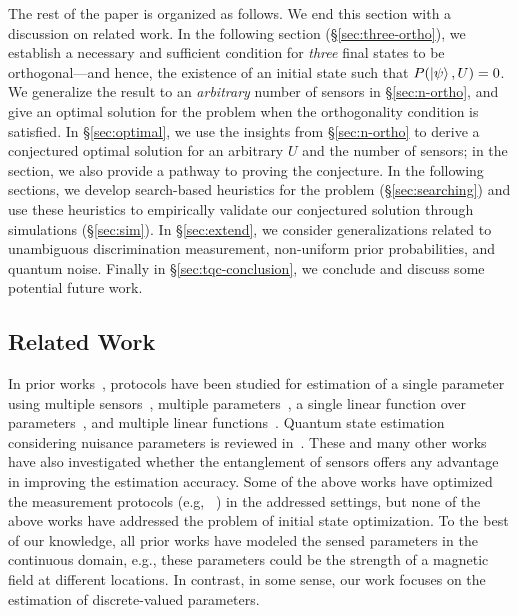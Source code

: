 The rest of the paper is organized as follows. We end this section with a discussion on related work.
In the following section (\S\ref{sec:three-ortho}), 
we establish a necessary and sufficient condition for \emph{three} final states to be orthogonal---and hence, the existence of an initial state such that 
$P(\ket{\psi}, U) = 0$. 
We generalize the result to an \emph{arbitrary} number of sensors in \S\ref{sec:n-ortho},
and give an optimal solution for the \iso problem when the orthogonality condition is satisfied.
In \S\ref{sec:optimal}, we use the insights from \S\ref{sec:n-ortho} to derive a conjectured optimal solution for an arbitrary $U$ and the number of sensors; in the section, we also provide a pathway to proving the conjecture. 
In the following sections, we develop search-based heuristics for the problem (\S\ref{sec:searching}) and use these heuristics to 
empirically validate our conjectured solution through simulations (\S\ref{sec:sim}).
In \S\ref{sec:extend}, we consider generalizations related to 
unambiguous discrimination measurement, non-uniform prior probabilities, and quantum noise.
Finally in \S\ref{sec:tqc-conclusion}, we conclude and discuss some potential future work.

\subsection{Related Work}
\label{sec:related}

In prior works~\cite{Eldredge_2018,Rubio_2020}, protocols have been studied for estimation of a single parameter using multiple sensors~\cite{Giovannetti_2011}, multiple parameters~\cite{mpe_2018,mpe_2020}, a single linear function over parameters~\cite{Eldredge_2018,mpe_2018,Sidhu_2020}, and multiple linear functions~\cite{Rubio_2020,Altenburg_2019}. 
Quantum state estimation considering nuisance parameters is reviewed in~\cite{Suzuki_2020}.
These and many other works~\cite{Eldredge_2018,mpe_2018,Jacobs_2018} have also
investigated whether the entanglement of sensors offers any advantage 
in improving the estimation accuracy. Some of the above works have optimized
the measurement protocols (e.g, ~\cite{Eldredge_2018,PhysRevA.qsn}) in the addressed
settings, but none of the above works have addressed the problem of initial state optimization.
To the best of our knowledge, all prior works have modeled the 
sensed parameters in the continuous domain, e.g., these parameters could be the 
strength of a magnetic field at different locations. In contrast, in some sense, our work focuses on the estimation of discrete-valued parameters. 

